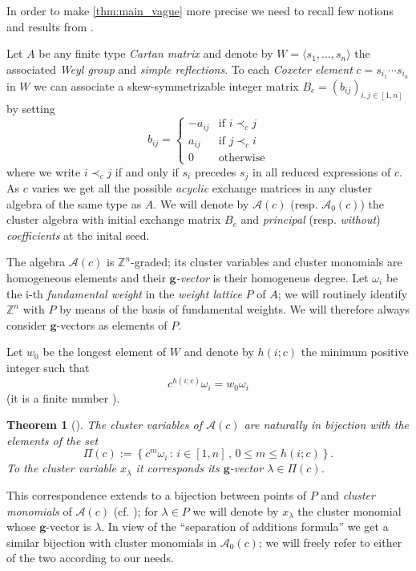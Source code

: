 \documentclass[11pt]{amsart}
\newcommand{\cA}{\mathcal{A}}
\newcommand{\ZZ}{\mathbb{Z}}
\newcommand{\bg}{\mathbf{g}}
\newtheorem{theorem}{Theorem}[section]
\numberwithin{equation}{section}
\begin{document}
  In order to make \cref{thm:main_vague} more precise we need to recall few notions and results from \cite{Ste13,YZ08}.

  Let $A$ be any finite type \emph{Cartan matrix} and denote by $W=\langle s_1,\dots,s_n\rangle$ the associated \emph{Weyl group} and \emph{simple reflections}.
  To each \emph{Coxeter element} $c=s_{i_1}\cdots s_{i_n}$ in $W$ we can associate a skew-symmetrizable integer matrix $B_c=(b_{ij})_{i,j\in[1,n]}$ by setting
  \[
    b_{ij}=
    \begin{cases}
      -a_{ij} & \text{if } i\prec_c j  \\
      a_{ij}  & \text{if } j\prec_c i  \\
      0       & \text{otherwise}
    \end{cases}
  \]
  where we write $i\prec_c j$ if and only if $s_i$ precedes $s_j$ in all reduced expressions of $c$.
  As $c$ varies we get all the possible \emph{acyclic} exchange matrices in any cluster algebra of the same type as $A$.
  We will denote by $\cA(c)$ (resp. $\cA_0(c)$) the cluster algebra with initial exchange matrix $B_c$ and  \emph{principal} (resp. \emph{without}) \emph{coefficients} at the inital seed.

  The algebra $\cA(c)$ is $\ZZ^n$-graded; its cluster variables and cluster monomials are homogeneous elements and their \emph{$\bg$-vector} is their homogeneus degree.
  Let $\omega_i$ be the i-th \emph{fundamental weight} in the \emph{weight lattice} $P$ of $A$; we will routinely identify $\ZZ^n$ with $P$ by means of the basis of fundamental weights.
  We will therefore always consider $\bg$-vectors as elements of $P$.

  Let $w_0$ be the longest element of $W$ and denote by $h(i;c)$ the minimum positive integer such that 
  \[
    c^{h(i;c)}\omega_i = w_0\omega_i
  \]
  (it is a finite number \cite[Proposition 1.3]{YZ08}).
  \begin{theorem}[{\cite[Theorem 1.4]{YZ08}}]
    The cluster variables of $\cA(c)$ are naturally in bijection with the elements of the set
    \[
      \Pi(c)
      :=
      \left\{
        c^m\omega_i \, :\, i\in[1,n] \, , \, 0\leq m \leq h(i;c) 
      \right\}.
    \]
    To the cluster variable $x_\lambda$ it corresponds its $\bg$-vector $\lambda\in\Pi(c)$.
  \end{theorem}
  This correspondence extends to a bijection between points of $P$ and \emph{cluster monomials} of $\cA(c)$ (cf. \cite[Theorem 1.2]{Ste13}); for $\lambda\in P$ we will denote by $x_\lambda$ the cluster monomial whose $\bg$-vector is $\lambda$.
  In view of the ``separation of additions formula'' we get a similar bijection with cluster monomials in $\cA_0(c)$; we will freely refer to either of the two according to our needs.
\end{document}
